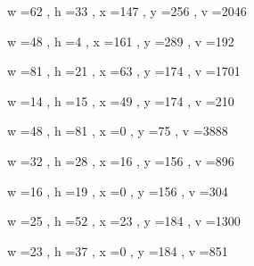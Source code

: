 \documentclass[11pt]{article}
\begin{document}
w =62 , h =33 , x =147 , y =256 , v =2046
\par
w =48 , h =4 , x =161 , y =289 , v =192
\par
w =81 , h =21 , x =63 , y =174 , v =1701
\par
w =14 , h =15 , x =49 , y =174 , v =210
\par
w =48 , h =81 , x =0 , y =75 , v =3888
\par
w =32 , h =28 , x =16 , y =156 , v =896
\par
w =16 , h =19 , x =0 , y =156 , v =304
\par
w =25 , h =52 , x =23 , y =184 , v =1300
\par
w =23 , h =37 , x =0 , y =184 , v =851
\par
\newpage
\end{document}
